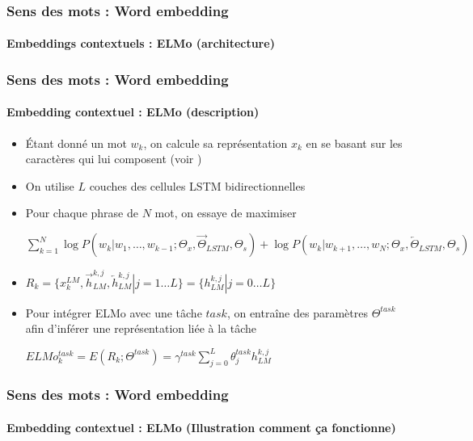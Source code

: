 \documentclass[xcolor=table]{beamer}
\begin{document}
\begin{frame}
\frametitle{Sens des mots : Word embedding}
\framesubtitle{Embeddings contextuels : ELMo (architecture)}
	
	
\end{frame}

\begin{frame}
\frametitle{Sens des mots : Word embedding}
\framesubtitle{Embedding contextuel : ELMo (description)}

\begin{itemize}
	\item Étant donné un mot $w_k$, on calcule sa représentation $x_k$ en se basant sur les caractères qui lui composent (voir \cite{2015-kim-al})
	\item On utilise $L$ couches des cellules LSTM bidirectionnelles 
	\item Pour chaque  phrase de $N$ mot, on essaye de maximiser\\ 
	\begin{center}
		$\sum_{k=1}^{N} 
	\log P(w_k | w_1,\ldots,w_{k-1}; \Theta_x, \overrightarrow{\Theta}_{LSTM}, \Theta_s)
	+
	\log P(w_k | w_{k+1},\ldots,w_{N}; \Theta_x, \overleftarrow{\Theta}_{LSTM}, \Theta_s)
	$
	\end{center}
	
	\item $R_k = \{x_k^{LM}, \overrightarrow{h}_{LM}^{k, j}, \overleftarrow{h}_{LM}^{k, j} | j= 1 \ldots L \}
	= \{h_{LM}^{k, j} | j= 0 \ldots L \}
	$
	
	\item Pour intégrer ELMo avec une tâche  $task$, on entraîne des paramètres $\Theta^{task}$ afin d'inférer une représentation liée à la tâche \\
	\begin{center}
		$ELMo_k^{task} = E(R_k; \Theta^{task}) = \gamma^{task} \sum_{j=0}^{L} \theta_j^{task} h_{LM}^{k, j}$
	\end{center}
\end{itemize}

\end{frame}

\begin{frame}
\frametitle{Sens des mots : Word embedding}
\framesubtitle{Embedding contextuel : ELMo (Illustration comment ça fonctionne)}

\vspace{-3pt}
\begin{center}
\end{center}
	
\end{frame}
\end{document}
